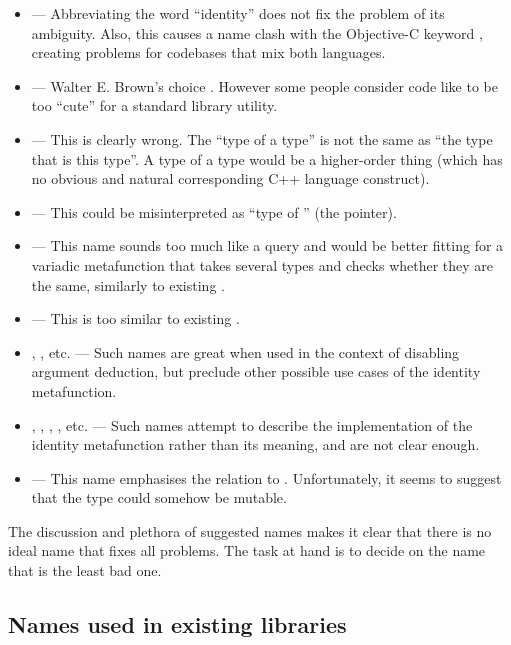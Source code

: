 \begin{itemize}
\item {} --- Abbreviating the word ``identity'' does not fix the problem of its ambiguity. Also, this causes a name clash with the Objective-C keyword , creating problems for codebases that mix both languages.
\item {} --- Walter E. Brown's choice \cite{Brown2014}. However some people consider code like  to be too ``cute'' for a standard library utility.
\item {} --- This is clearly wrong. The ``type of a type'' is not the same as ``the type that is this type''. A type of a type would be a higher-order thing (which has no obvious and natural corresponding C++ language construct).
\item {} --- This could be misinterpreted as ``type of '' (the  pointer).
\item {} --- This name sounds too much like a query and would be better fitting for a variadic metafunction that takes several types and checks whether they are the same, similarly to existing .
\item {} --- This is too similar to existing .
\item {}, , etc. --- Such names are great when used in the context of disabling argument deduction, but preclude other possible use cases of the identity metafunction.
\item {}, , ,  , etc. --- Such names attempt to describe the implementation of the identity metafunction rather than its meaning, and are not clear enough.
\item {} --- This name emphasises the relation to . Unfortunately, it seems to suggest that the type could somehow be mutable.
\end{itemize}

The discussion and plethora of suggested names makes it clear that there is no ideal name that fixes all problems. The task at hand is to decide on the name that is the least bad one.

\subsection{Names used in existing libraries}
\label{subsec:names_existing}


